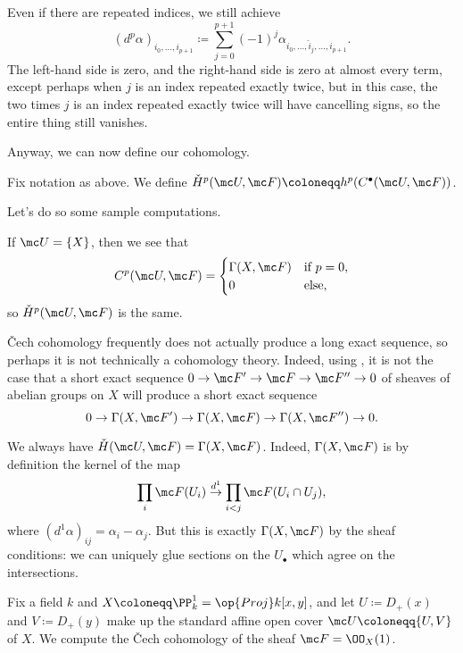 \documentclass[../notes.tex]{subfiles}
\begin{document}
\begin{remark}
	Even if there are repeated indices, we still achieve
	\[(d^p\alpha)_{i_0,\ldots,i_{p+1}}\coloneqq\sum_{j=0}^{p+1}(-1)^j\alpha_{i_0,\ldots,\widehat i_j,\ldots,i_{p+1}}.\]
	The left-hand side is zero, and the right-hand side is zero at almost every term, except perhaps when $j$ is an index repeated exactly twice, but in this case, the two times $j$ is an index repeated exactly twice will have cancelling signs, so the entire thing still vanishes.
\end{remark}
Anyway, we can now define our cohomology.
\begin{defihelper} 
	Fix notation as above. We define $\check H^p(\mc U,\mc F)\coloneqq h^p(C^\bullet(\mc U,\mc F))$.
\end{defihelper}
Let's do so some sample computations.
\begin{example} \label{ex:cech-trivial-open-cover}
	If $\mc U=\{X\}$, then we see that
	\[C^p(\mc U,\mc F)=\begin{cases}
		\Gamma(X,\mc F) & \text{if }p=0, \\
		0 & \text{else},
	\end{cases}\]
	so $\check H^p(\mc U,\mc F)$ is the same.
\end{example}
\begin{remark}
	\v Cech cohomology frequently does not actually produce a long exact sequence, so perhaps it is not technically a cohomology theory. Indeed, using , it is not the case that a short exact sequence $0\to\mc F'\to\mc F\to\mc F''\to0$ of sheaves of abelian groups on $X$ will produce a short exact sequence
	\[0\to\Gamma(X,\mc F')\to\Gamma(X,\mc F)\to\Gamma(X,\mc F'')\to0.\]
\end{remark}
\begin{example}
	We always have $\check H(\mc U,\mc F)=\Gamma(X,\mc F)$. Indeed, $\Gamma(X,\mc F)$ is by definition the kernel of the map
	\[\prod_i\mc F(U_i)\stackrel{d^1}\to\prod_{i<j}\mc F(U_i\cap U_j),\]
	where $(d^1\alpha)_{ij}=\alpha_i-\alpha_j$. But this is exactly $\Gamma(X,\mc F)$ by the sheaf conditions: we can uniquely glue sections on the $U_\bullet$ which agree on the intersections.
\end{example}
\begin{exe}
	Fix a field $k$ and $X\coloneqq\PP^1_k=\op{Proj}k[x,y]$, and let $U\coloneqq D_+(x)$ and $V\coloneqq D_+(y)$ make up the standard affine open cover $\mc U\coloneqq\{U,V\}$ of $X$. We compute the \v Cech cohomology of the sheaf $\mc F=\OO_X(1)$.
\end{exe}
\end{document}
